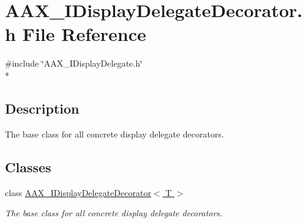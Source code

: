 \hypertarget{a00242}{}\section{A\+A\+X\+\_\+\+I\+Display\+Delegate\+Decorator.\+h File Reference}
\label{a00242}
{\ttfamily \#include \char`\"{}A\+A\+X\+\_\+\+I\+Display\+Delegate.\+h\char`\"{}}\\*


\subsection{Description}
The base class for all concrete display delegate decorators. 

\subsection*{Classes}
\begin{DoxyCompactItemize}
\item 
class \hyperlink{a00094}{A\+A\+X\+\_\+\+I\+Display\+Delegate\+Decorator$<$ T $>$}
\begin{DoxyCompactList}\small\item\em The base class for all concrete display delegate decorators. \end{DoxyCompactList}\end{DoxyCompactItemize}
